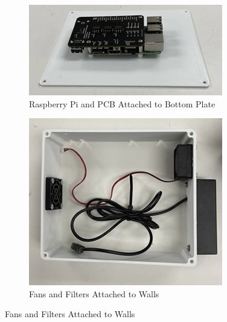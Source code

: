     \begin{figure}[H]
        \centering
        \begin{subfigure}{.45\textwidth}
            \includegraphics[width=\textwidth]{graphics/Bottom Internals.jpeg}
            \caption{Raspberry Pi and PCB Attached to Bottom Plate}
            \label{fig:Bottom Internals}
        \end{subfigure}
        \begin{subfigure}{.45\textwidth}
            \includegraphics[width=\textwidth]{graphics/Fans.jpeg}
            \caption{Fans and Filters Attached to Walls}
            \label{fig:Bottom Internals 2}
        \end{subfigure}
    \end{figure}
\pagebreak
